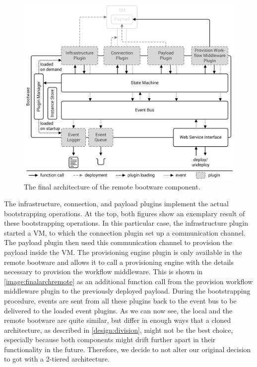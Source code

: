 \begin{figure}[!htbp]
	\centering
	\includegraphics[resolution=600]{design/assets/final_architecture_remote}
	\caption{The final architecture of the remote bootware component.}
	\label{image:finalarchremote}
\end{figure}

The infrastructure, connection, and payload plugins implement the actual bootstrapping operations.
At the top, both figures show an exemplary result of these bootstrapping operations.
In this particular case, the infrastructure plugin started a VM, to which the connection plugin set up a communication channel.
The payload plugin then used this communication channel to provision the payload inside the VM.
The provisioning engine plugin is only available in the remote bootware and allows it to call a provisioning engine with the details necessary to provision the workflow middleware.
This is shown in \autoref{image:finalarchremote} as an additional function call from the provision workflow middleware plugin to the previously deployed payload.
During the bootstrapping procedure, events are sent from all these plugins back to the event bus to be delivered to the loaded event plugins.
As we can now see, the local and the remote bootware are quite similar, but differ in enough ways that a cloned architecture, as described in \autoref{design:division}, might not be the best choice, especially because both components might drift further apart in their functionality in the future.
Therefore, we decide to not alter our original decision to got with a 2-tiered architecture.
